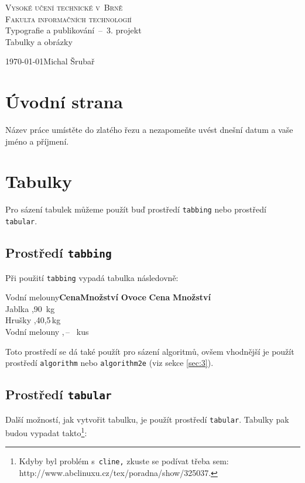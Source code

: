 \documentclass[11pt,a4paper]{article}
\begin{document}
\begin{titlepage}
\begin{center}
	\Huge \textsc{Vysoké učení technické v~Brně}\\
	\huge \textsc{Fakulta informačních technologií}\\
	\LARGE Typografie a publikování \,--\, 3. projekt\\[2mm]
	{\Huge Tabulky a obrázky}\\
\end{center}
\Large\today\hfill Michal Šrubař
\medskip
\end{titlepage}

\section{Úvodní strana}
Název práce umístěte do zlatého řezu a nezapomeňte uvést dnešní datum a vaše
jméno a příjmení.

\section{Tabulky}
Pro sázení tabulek můžeme použít buď prostředí \verb|tabbing| nebo prostředí
\verb|tabular|.

\subsection{Prostředí \texttt{tabbing}}
Při použití \verb|tabbing| vypadá tabulka následovně:
\begin{tabbing}
	Vodní melouny\quad\=\textbf{Cena}\quad\=\textbf{Množství}\kill
	\textbf{Ovoce} \> \textbf{Cena} \> \textbf{Množství} \\
	Jablka ,90 \,kg\\
	Hrušky ,40,5\,kg\\
	Vodní melouny ,\hspace{-0.5mm}\,--\  kus\\
\end{tabbing}
Toto prostředí se dá také použít pro sázení algoritmů, ovšem vhodnější je použít
prostředí \verb|algorithm| nebo \verb|algorithm2e| (viz sekce \ref{sec:3}).

\subsection{Prostředí \texttt{tabular}}
Další možností, jak vytvořit tabulku, je použít prostředí \verb|tabular|.
Tabulky pak budou vypadat takto\footnote{Kdyby byl problém s~\texttt{cline,} 
zkuste se podívat třeba sem: http://www.abclinuxu.cz/tex/poradna/show/325037.}:\\
\end{document}
